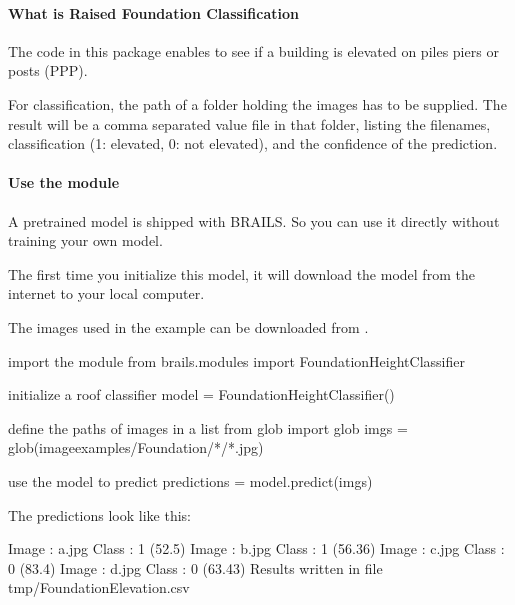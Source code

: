 \documentclass[letterpaper,10pt,english]{sphinxmanual}
\begin{document}
\paragraph{What is Raised Foundation Classification}
\label{\detokenize{common/user_manual/modules/foundationElevationClassifier:what-is-raised-foundation-classification}}
\sphinxAtStartPar
The code in this package enables to see if a building is elevated on piles piers or posts (PPP).

\sphinxAtStartPar
For classification, the path of a folder holding the images has to be supplied. The result will be a comma separated value file in that folder, listing the filenames, classification (1: elevated, 0: not elevated), and the confidence of the prediction.


\paragraph{Use the module}
\label{\detokenize{common/user_manual/modules/foundationElevationClassifier:use-the-module}}
\sphinxAtStartPar
A pretrained model is shipped with BRAILS. So you can use it directly without training your own model.

\sphinxAtStartPar
The first time you initialize this model, it will download the model from the internet to your local computer.

\sphinxAtStartPar
The images used in the example can be downloaded from .

\begin{sphinxVerbatim}[commandchars=\\\{\}]
\PYGZsh{} import the module
from brails.modules import FoundationHeightClassifier

\PYGZsh{} initialize a roof classifier
model = FoundationHeightClassifier()

\PYGZsh{} define the paths of images in a list
from glob import glob
imgs = glob(\PYGZsq{}image\PYGZus{}examples/Foundation/*/*.jpg\PYGZsq{})

\PYGZsh{} use the model to predict
predictions = model.predict(imgs)
\end{sphinxVerbatim}

\sphinxAtStartPar
The predictions look like this:

\begin{sphinxVerbatim}[commandchars=\\\{\}]
Image :  a.jpg     Class : 1 (52.5\PYGZpc{})
Image :  b.jpg     Class : 1 (56.36\PYGZpc{})
Image :  c.jpg     Class : 0 (83.4\PYGZpc{})
Image :  d.jpg     Class : 0 (63.43\PYGZpc{})
Results written in file tmp/FoundationElevation.csv
\end{sphinxVerbatim}
\end{document}
